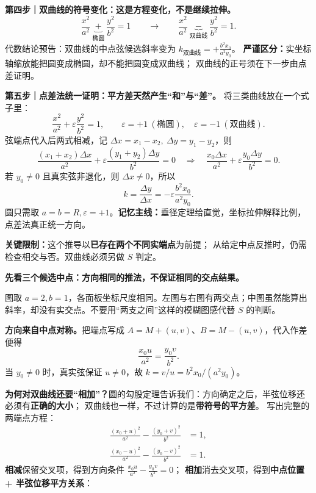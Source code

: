 \begin{explanationbox}
\textbf{第四步｜双曲线的符号变化：这是方程变化，不是继续拉伸。}
\[
\frac{x^2}{a^2}\ \underbrace{+}_{\text{椭圆}}\ \frac{y^2}{b^2}=1
\qquad\longrightarrow\qquad
\frac{x^2}{a^2}\ \underbrace{-}_{\text{双曲线}}\ \frac{y^2}{b^2}=1.
\]
代数结论预告：双曲线的中点弦候选斜率变为
$\boxed{k_{\text{双曲线}}=+\frac{b^2x_0}{a^2y_0}}$。
\textbf{严谨区分：}实坐标轴缩放能把圆变成椭圆，却不能把圆变成双曲线；
双曲线的正号须在下一步由点差证明。
\par\medskip\noindent
\textbf{第五步｜点差法统一证明：平方差天然产生“和”与“差”。}
将三类曲线放在一个式子里：
\[
\frac{x^2}{a^2}+\varepsilon\frac{y^2}{b^2}=1,
\qquad\varepsilon=+1\ (\text{椭圆}),\quad\varepsilon=-1\ (\text{双曲线}).
\]
弦端点代入后两式相减，记 $\Delta x=x_1-x_2,\ \Delta y=y_1-y_2$，则
\[
\frac{(x_1+x_2)\Delta x}{a^2}
+\varepsilon\frac{(y_1+y_2)\Delta y}{b^2}=0
\quad\Longrightarrow\quad
\frac{x_0\Delta x}{a^2}+\varepsilon\frac{y_0\Delta y}{b^2}=0.
\]
若 $y_0\ne0$ 且真实弦非退化，则 $\Delta x\ne0$，所以
\[
\boxed{k=\frac{\Delta y}{\Delta x}=-\varepsilon\frac{b^2x_0}{a^2y_0}}.
\]
圆只需取 $a=b=R,\varepsilon=+1$。\textbf{记忆主线：}垂径定理给直觉，坐标拉伸解释比例，点差法真正统一方向。
\par\medskip\noindent
\textbf{关键限制：}这个推导以\textbf{已存在两个不同实端点}为前提；
从给定中点反推时，仍需检查相交与否。双曲线必须另做 $S$ 判定。
\par\medskip\noindent
\textbf{先看三个候选中点：方向相同的推法，不保证相同的交点结果。}
\begin{center}\end{center}
图取 $a=2,b=1$，各面板坐标尺度相同。左图与右图有两交点；中图虽然能算出斜率，却没有实交点。不要用“两支之间”这样的模糊图感代替 $S$ 的判断。
\par\medskip
\textbf{方向来自中点对称。}把端点写成 $A=M+(u,v)$、$B=M-(u,v)$，代入作差便得
\[
\frac{x_0u}{a^2}=\frac{y_0v}{b^2}.
\]
当 $y_0\ne0$ 时，真实弦保证 $u\ne0$，故 $k=v/u=b^2x_0/(a^2y_0)$。
\par\medskip
\textbf{为何对双曲线还要``相加''？}圆的勾股定理告诉我们：方向确定之后，半弦位移还必须有\textbf{正确的大小}；
双曲线也一样，不过计算的是\textbf{带符号的平方差}。
写出完整的两端点方程：
\[
\begin{aligned}
\frac{(x_0+u)^2}{a^2}-\frac{(y_0+v)^2}{b^2}&=1,\\
\frac{(x_0-u)^2}{a^2}-\frac{(y_0-v)^2}{b^2}&=1.
\end{aligned}
\]
\textbf{相减}保留交叉项，得到方向条件
$\frac{x_0u}{a^2}-\frac{y_0v}{b^2}=0$；
\textbf{相加}消去交叉项，得到\textbf{中点位置 + 半弦位移平方关系}：

\end{explanationbox}
